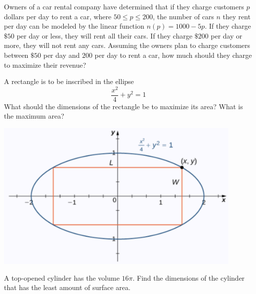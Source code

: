 \begin{exercise}

  Owners of a car rental company have determined that if they charge
  customers \(p\) dollars per day to rent a car, where \(50 \le p \le 200\), the
  number of cars \(n\) they rent per day can be modeled by the linear
  function \(n(p)=1000 - 5p\). If they charge \(\$50\) per day or less, they
  will rent all their cars. If they charge \(\$200\) per day or more, they
  will not rent any cars. Assuming the owners plan to charge customers
  between \(\$50\) per day and \(200\) per day to rent a car, how much
  should they charge to maximize their revenue?
  
\end{exercise}
\vspace*{6\baselineskip}

\begin{exercise}

A rectangle is to be inscribed in the ellipse \[\dfrac{x^2}{4}+y^2=1\]
What should the dimensions of the rectangle be to maximize its area?
What is the maximum area?

\includegraphics[width=0.9\textwidth]{img/image-20200420234107555.png}

\end{exercise}
\vspace*{6\baselineskip}

\begin{exercise}

A top-opened cylinder has the volume \(16\pi\). Find the dimensions of
the cylinder that has the least amount of surface area.

\end{exercise}

